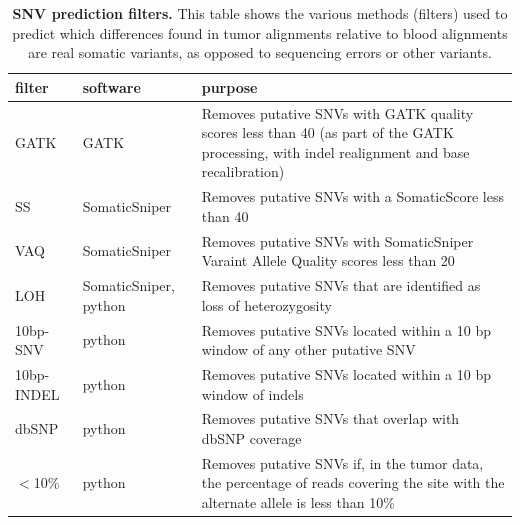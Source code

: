 \documentclass[11 pt]{article} %
\begin{document}
\begin{landscape}
\begin{table}
\caption{\textbf{SNV prediction filters.} This table shows the various methods (filters) used to predict which differences found in tumor alignments relative to blood alignments are real somatic variants, as opposed to sequencing errors or other variants.}
\label{tab:filters}
\begin{tabular}{ p{2.25cm} p{4.25cm} p{14cm} }
	filter & software & purpose \\
	\hline
	GATK & GATK & Removes putative SNVs with GATK quality scores less than 40 (as part of the GATK processing, with indel realignment and base recalibration) \\
	SS & SomaticSniper & Removes putative SNVs with a SomaticScore less than 40 \\
	VAQ & SomaticSniper & Removes putative SNVs with SomaticSniper Varaint Allele Quality scores less than 20 \\
	LOH & SomaticSniper, python & Removes putative SNVs that are identified as loss of heterozygosity \\
	10bp-SNV & python & Removes putative SNVs located within a 10 bp window of any other putative SNV \\
	10bp-INDEL & python & Removes putative SNVs located within a 10 bp window of indels \\
	dbSNP & python & Removes putative SNVs that overlap with dbSNP coverage \\
	$<$10\% & python & Removes putative SNVs if, in the tumor data, the percentage of reads covering the site with the alternate allele is less than 10\% \\
\end{tabular}
\end{table}
\end{landscape}
\end{document}
